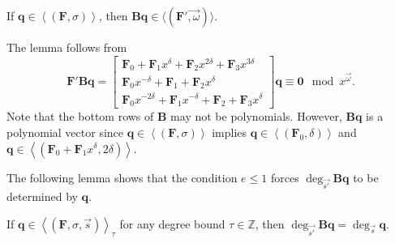\begin{lem}
\label{lem:qToBqOrder}If $\mathbf{q}\in\left\langle \left(\mathbf{F},\sigma\right)\right\rangle $,
then $\mathbf{B}\mathbf{q}\in\langle(\mathbf{F}'\vec{,\omega})\rangle$.\end{lem}
\begin{pf}
The lemma follows from \[
\mathbf{F}'\mathbf{B}\mathbf{q}=\left[\begin{array}{r}
\mathbf{F}_{0}+\mathbf{F}_{1}x^{\delta}+\mathbf{F}_{2}x^{2\delta}+\mathbf{F}_{3}x^{3\delta}\\
\mathbf{F}_{0}x^{-\delta}+\mathbf{F}_{1}+\mathbf{F}_{2}x^{\delta}\\
\mathbf{F}_{0}x^{-2\delta}+\mathbf{F}_{1}x^{-\delta}+\mathbf{F}_{2}+\mathbf{F}_{3}x^{\delta}\end{array}\right]\mathbf{q}\equiv\mathbf{0}\mod x^{\vec{\omega}}.\]
 Note that the bottom rows of $\mathbf{B}$ may not be polynomials.
However, $\mathbf{B}\mathbf{q}$ is a polynomial vector since $\mathbf{q}\in\left\langle \left(\mathbf{F},\sigma\right)\right\rangle $
implies $\mathbf{q}\in\left\langle \left(\mathbf{F}_{0},\delta\right)\right\rangle $
and $\mathbf{q}\in\left\langle \left(\mathbf{F}_{0}+\mathbf{F}_{1}x^{\delta},2\delta\right)\right\rangle $. 
\end{pf}
\noindent The following lemma shows that the condition $e\le1$ forces
$\deg_{\vec{s'}}\mathbf{B}\mathbf{q}$ to be determined by $\mathbf{q}$. 
\begin{lem}
\label{lem:qToBqDegree}If $\mathbf{q}\in\left\langle \left(\mathbf{F},\sigma,\vec{s}\right)\right\rangle _{\tau}$
for any degree bound $\tau\in\mathbb{Z}$, then $\deg_{\vec{s'}}\mathbf{B}\mathbf{q}=\deg_{\vec{s}}\mathbf{q}$.\end{lem}
